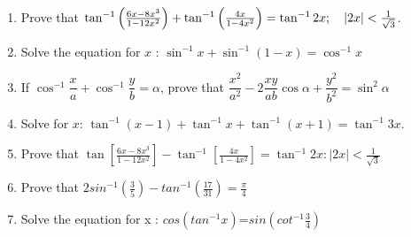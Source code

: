 \begin{enumerate}
    \item Prove that $\tan^{-1}\left(\frac{6x-8x^3}{1-12x^2}\right) + \tan^{-1}\left(\frac{4x}{1-4x^2}\right) = \tan^{-1}2x; \quad \left\vert2x\right\vert<\frac{1}{\sqrt{3}}$.
    \item Solve the equation for $x$ : $\sin^{-1} x+\sin^{-1}(1-x)=\cos^{-1}x$
    \item If $\cos^{-1}\dfrac{x}{a}+\cos^{-1}\dfrac{y}{b}=\alpha$, prove that $\dfrac{x^2}{a^2} - 2\dfrac{xy}{ab}\cos\alpha + \dfrac{y^2}{b^2} = \sin^2\alpha$
    \item Solve for $x$: $\tan^{-1}(x-1) + \tan^{-1}x + \tan^{-1}(x+1) = \tan^{-1}3x$.
    \item Prove that $\tan[\frac{6x-8x^3}{1-12x^2}]-\tan^{-1}[\frac{4x}{1-4x^2}]=\tan^{-1}2x:|2x|<\frac{1}{\sqrt{3}}$
    \item Prove that $2sin^{-1}(\frac{3}{5})-tan^{-1}(\frac{17}{31}) = \frac{\pi}{4} $
    \item Solve the equation for x : $cos(tan^{-1}{x})$=$sin(cot^{-1}\frac{3}{4})$

\end{enumerate}

